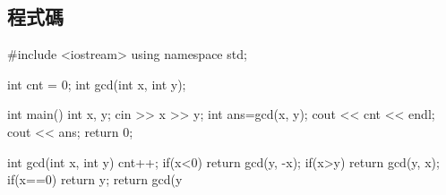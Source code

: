 \subsection{程式碼}
\begin{cppcode}
	#include <iostream>
	using namespace std;
	
	int cnt = 0;
	int gcd(int x, int y);
	
	int main()
	{
		int x, y;
		cin >> x >> y;
		int ans=gcd(x, y);
		cout << cnt << endl;
		cout << ans;
		return 0;
	}

	int gcd(int x, int y) {
		cnt++;
		if(x<0) return gcd(y, -x);
		if(x>y) return gcd(y, x);
		if(x==0) return y;
		return gcd(y%
	}	
\end{cppcode}
